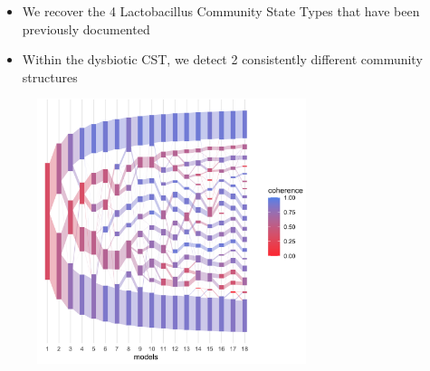 \documentclass{beamer}
\begin{document}
\begin{frame}
  \begin{itemize}
  \item We recover the 4 Lactobacillus Community State Types that have been
  previously documented
  \item Within the dysbiotic CST, we detect 2 consistently different community
  structures
  \end{itemize}
\begin{figure}
  \includegraphics[width=0.7\textwidth]{microbiome_coherence}
\end{figure}
\end{frame}
\end{document}
